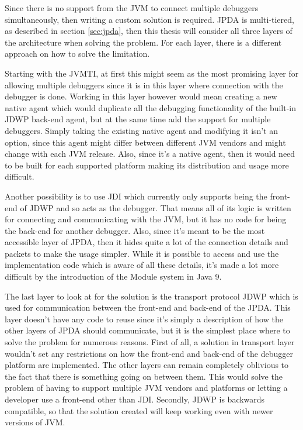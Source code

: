 \documentclass[..thesis.tex]{subfiles}
\begin{document}
Since there is no support from the JVM to connect multiple debuggers simultaneously, then writing a custom solution is required. 
JPDA is multi-tiered, as described in section \ref{sec:jpda}, then this thesis will consider all three layers of the architecture when solving the problem.
For each layer, there is a different approach on how to solve the limitation.

Starting with the JVMTI, at first this might seem as the most promising layer for allowing multiple debuggers since it is in this layer where connection with the debugger is done.
Working in this layer however would mean creating a new native agent which would duplicate all the debugging functionality of the built-in JDWP back-end agent, but at the same time add the support for multiple debuggers.
Simply taking the existing native agent and modifying it isn't an option, since this agent might differ between different JVM vendors and might change with each JVM release.
Also, since it's a native agent, then it would need to be built for each supported platform making its distribution and usage more difficult.

Another possibility is to use JDI which currently only supports being the front-end of JDWP and so acts as the debugger.
That means all of its logic is written for connecting and communicating with the JVM, but it has no code for being the back-end for another debugger.
Also, since it's meant to be the most accessible layer of JPDA, then it hides quite a lot of the connection details and packets to make the usage simpler.
While it is possible to access and use the implementation code which is aware of all these details, it's made a lot more difficult by the introduction of the Module system in Java 9.

The last layer to look at for the solution is the transport protocol JDWP which is used for communication between the front-end and back-end of the JPDA.
This layer doesn't have any code to reuse since it's simply a description of how the other layers of JPDA should communicate, but it is the simplest place where to solve the problem for numerous reasons.
First of all, a solution in transport layer wouldn't set any restrictions on how the front-end and back-end of the debugger platform are implemented.
The other layers can remain completely oblivious to the fact that there is something going on between them.
This would solve the problem of having to support multiple JVM vendors and platforms or letting a developer use a front-end other than JDI.
Secondly, JDWP is backwards compatible, so that the solution created will keep working even with newer versions of JVM.
\end{document}
